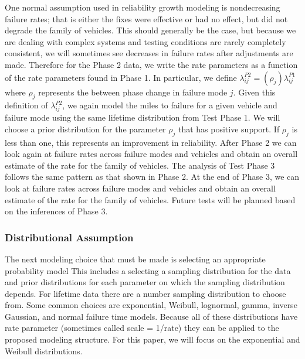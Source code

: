 \documentclass[12pt]{article}
\begin{document}
One normal assumption used in reliability growth modeling is nondecreasing
failure rates; that is either the fixes were effective or had no effect, but did
not degrade the family of vehicles.  This should generally be the case, but
because we are dealing with complex systems and testing conditions are rarely
completely consistent, we will sometimes see decreases in failure rates after
adjustments are made.  Therefore for the Phase 2 data, we write the rate
parameters as a function of the rate parameters found in Phase 1. In particular,
we define $\lambda_{ij}^{P2}=(\rho_{j})\lambda_{ij}^{P1}$ where $\rho_{j}$
represents the between phase change in failure mode $j$. Given this definition
of $\lambda_{ij}^{P2}$, we again model the miles to failure for a given vehicle
and failure mode using the same lifetime distribution from Test Phase 1.  We
will choose a prior distribution for the parameter $\rho_{j}$ that has positive
support.  If $\rho_{j}$ is less than one, this represents an improvement in
reliability.  After Phase 2 we can look again at failure rates across failure
modes and vehicles and obtain an overall estimate of the rate for the family of
vehicles.  The analysis of Test Phase 3 follows the same pattern as that shown
in Phase 2. At the end of Phase 3, we can look at failure rates across failure
modes and vehicles and obtain an overall estimate of the rate for the family of
vehicles. Future tests will be planned based on the inferences of Phase 3.

\subsubsection{Distributional Assumption}
The next modeling choice that must be made is selecting an appropriate
probability model This includes a selecting a sampling distribution for the data
and prior distributions for each parameter on which the sampling distribution
depends.  For lifetime data there are a number sampling distribution to choose
from.  Some common choices are exponential, Weibull, lognormal, gamma, inverse
Gaussian, and normal failure time models.  Because all of these distributions
have rate parameter (sometimes called scale = 1/rate) they can be applied to
the proposed modeling structure.  For this paper, we will focus on the
exponential and Weibull distributions.
\end{document}
